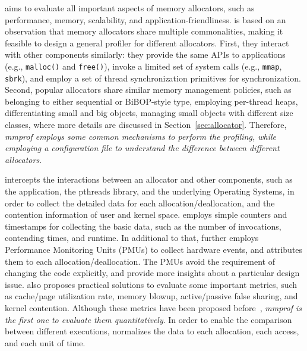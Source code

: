\MP{} aims to evaluate all important aspects of memory allocators, such as performance, memory, scalability, and application-friendliness. \MP{} is based on an observation that memory allocators share multiple commonalities, making it feasible to design a general profiler for different allocators. First, they interact with other components similarly: they provide the same APIs to applications (e.g., \texttt{malloc()} and \texttt{free()}), invoke a limited set of system calls (e.g., \texttt{mmap}, \texttt{sbrk}), and employ a set of thread synchronization primitives for  synchronization. Second, popular allocators share similar memory management policies, such as belonging to either sequential or BiBOP-style type, employing per-thread heaps, differentiating small and big objects, managing small objects with different size classes, where more details are discussed in Section~\ref{sec:allocator}. Therefore, \textit{mmprof employs some common mechanisms to perform the profiling, while employing a configuration file to understand the difference between different allocators}.    

\MP{} intercepts the interactions between an allocator and other components, such as the application, the pthreads library, and the underlying Operating Systems, in order to collect the detailed data for each allocation/deallocation, and the contention information of user and kernel space. 
 \MP{} employs simple counters and timestamps for collecting the basic data, such as the number of invocations, contending times, and runtime. In additional to that, \MP{} further employs Performance Monitoring Units (PMUs) to collect hardware events, and attributes them to each allocation/deallocation. The PMUs avoid the requirement of changing the code explicitly, and provide more insights about  a particular design issue. \MP{} also proposes practical solutions to evaluate some important metrics, such as cache/page utilization rate, memory blowup, active/passive false sharing, and kernel contention. Although these metrics have been proposed before~\cite{Hoard}, \textit{mmprof is the first one to evaluate them quantitatively}. In order to enable the comparison between different executions, \MP{} normalizes the data to each allocation, each access, and each unit of time.  


